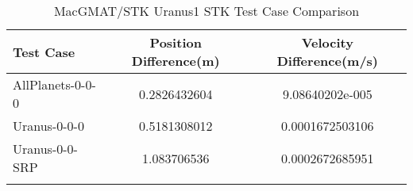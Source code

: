\begin{table}[htbp!]
\centering
\caption{ MacGMAT/STK Uranus1 STK Test Case Comparison}
      \begin{tabular}{lcc}
      \hline\hline
          Test Case & Position Difference(m) & Velocity Difference(m/s) \\
         \hline
         AllPlanets-0-0-0 & 0.2826432604 & 9.08640202e-005 \\
         Uranus-0-0-0 & 0.5181308012 & 0.0001672503106 \\
         Uranus-0-0-SRP & 1.083706536 & 0.0002672685951 \\
      \hline\hline
      \label{Table: Uranus1 STK Table} 
\end{tabular}
\end{table}
